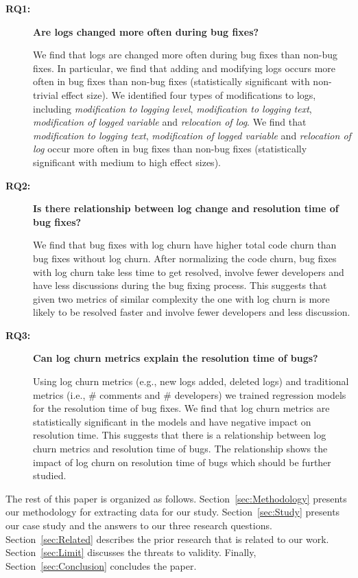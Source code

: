 \begin{description}
\item[\textbf{RQ1:}]\textbf{Are logs changed more often during bug fixes?} 

We find that logs are changed more often during bug fixes than non-bug fixes. In particular, we find that adding and modifying logs occurs more often in bug fixes than non-bug fixes (statistically significant with non-trivial effect size). We identified four types of modifications to logs, including \emph{modification to logging level}, \emph{modification to logging text}, \emph{modification of logged variable} and \emph{relocation of log}. We find that \emph{modification to logging text}, \emph{modification of logged variable} and \emph{relocation of log} occur more often in bug fixes than non-bug fixes (statistically significant with medium to high effect sizes). 



\item[\textbf{RQ2:}]\textbf{Is there relationship between log change and resolution time of bug fixes?}

We find that bug fixes with log churn have higher total code churn than bug fixes without log churn. After normalizing the code churn, bug fixes with log churn take less time to get resolved, involve fewer developers and have less discussions during the bug fixing process. This suggests that given two metrics of similar complexity the one with log churn is more likely to be resolved faster and involve fewer developers and less discussion. 



\item[\textbf{RQ3:}]\textbf{Can log churn metrics explain the resolution time of bugs?}

Using log churn metrics (e.g., new logs added, deleted logs) and traditional metrics (i.e., \# comments and \# developers) we trained regression models for the resolution time of bug fixes. We find that log churn metrics are statistically significant in the models and have negative impact on resolution time. This suggests that there is a relationship between log churn metrics and resolution time of bugs. The relationship shows the impact of log churn on resolution time of bugs which should be further studied. 

\end{description}


The rest of this paper is organized as follows. Section~\ref{sec:Methodology} presents our methodology for extracting data for our study. Section~\ref{sec:Study} presents our case study and the answers to our three research questions. Section~\ref{sec:Related} describes the prior research that is related to our work. Section~\ref{sec:Limit}  discusses the threats to validity. Finally, Section~\ref{sec:Conclusion} concludes the paper.


